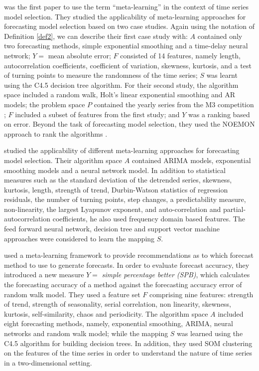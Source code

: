 \documentclass[11pt,a4paper,]{article}
\theoremstyle{definition}
\theoremstyle{definition}
\theoremstyle{definition}
\theoremstyle{remark}
\begin{document}
\textcite{prudencio2004meta} was the first paper to use the term
``meta-learning'' in the context of time series model selection. They
studied the applicability of meta-learning approaches for forecasting
model selection based on two case studies. Again using the notation of
Definition \ref{def2}, we can describe their first case study with:
\(A\) contained only two forecasting methods, simple exponential
smoothing and a time-delay neural network; \(Y=\) mean absolute error;
\(F\) consisted of 14 features, namely length, autocorrelation
coefficients, coefficient of variation, skewness, kurtosis, and a test
of turning points to measure the randomness of the time series; \(S\)
was learnt using the C4.5 decision tree algorithm. For their second
study, the algorithm space included a random walk, Holt's linear
exponential smoothing and AR models; the problem space \(P\) contained
the yearly series from the M3 competition \autocite{makridakis2000m3};
\(F\) included a subset of features from the first study; and \(Y\) was
a ranking based on error. Beyond the task of forecasting model
selection, they used the NOEMON approach to rank the algorithms
\autocite{kalousis1999noemon}.

\textcite{lemke2010meta} studied the applicability of different
meta-learning approaches for forecasting model selection. Their
algorithm space \(A\) contained ARIMA models, exponential smoothing
models and a neural network model. In addition to statistical measures
such as the standard deviation of the detrended series, skewness,
kurtosis, length, strength of trend, Durbin-Watson statistics of
regression residuals, the number of turning points, step changes, a
predictability measure, non-linearity, the largest Lyapunov exponent,
and auto-correlation and partial-autocorrelation coefficients, he also
used frequency domain based features. The feed forward neural network,
decision tree and support vector machine approaches were considered to
learn the mapping \(S\).

\textcite{wang2009rule} used a meta-learning framework to provide
recommendations as to which forecast method to use to generate
forecasts. In order to evaluate forecast accuracy, they introduced a new
measure \(Y =\) \emph{simple percentage better (SPB)}, which calculates
the forecasting accuracy of a method against the forecasting accuracy
error of random walk model. They used a feature set \(F\) comprising
nine features: strength of trend, strength of seasonality, serial
correlation, non linearity, skewness, kurtosis, self-similarity, chaos
and periodicity. The algorithm space \(A\) included eight forecasting
methods, namely, exponential smoothing, ARIMA, neural networks and
random walk model; while the mapping \(S\) was learned using the C4.5
algorithm for building decision trees. In addition, they used SOM
clustering on the features of the time series in order to understand the
nature of time series in a two-dimensional setting.
\end{document}
